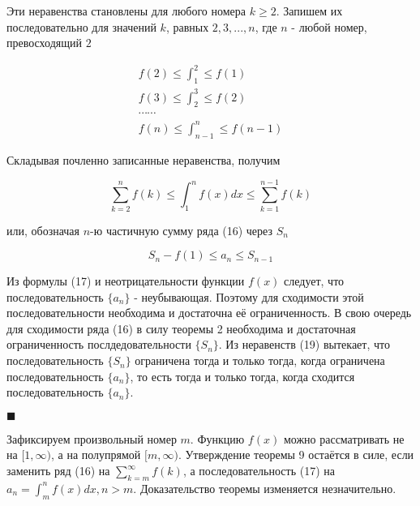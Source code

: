 Эти неравенства становлены для любого номера $k \geqslant 2$. Запишем их последовательно для значений $k$, равных $2, 3, ..., n$, где $n$ - любой номер, превосходящий $2$

\begin{equation*}
	\begin{gathered}
		f(2) \leqslant \displaystyle\int_{1}^2  \leqslant  f(1) \\
		f(3) \leqslant \displaystyle\int_{2}^3  \leqslant  f(2) \\
		\cdots \cdots \\
		f(n) \leqslant \displaystyle\int_{n -1}^n  \leqslant  f(n - 1)
	\end{gathered}
\end{equation*}

Складывая почленно записанные неравенства, получим

\begin{equation*}
	\displaystyle\sum_{k = 2}^n f(k) \leqslant \displaystyle\int_1^n f(x)dx \leqslant \displaystyle\sum_{k = 1}^{n - 1} f(k)
\end{equation*}

или, обозначая $n$-ю частичную сумму ряда (16) через $S_n$

\begin{equation}
	S_n - f(1) \leqslant a_n \leqslant S_{n - 1}
\end{equation}

Из формулы (17) и неотрицательности функции $f(x)$ следует, что последовательность $\{a_n\}$ - неубывающая. Поэтому для сходимости этой последовательности необходима и достаточна её ограниченность. В свою очередь для сходимости ряда (16) в силу теоремы 2 необходима и достаточная ограниченность послдедовательности $\{S_n\}$. Из неравенств (19) вытекает, что последовательность $\{S_n\}$ ограничена тогда и только тогда, когда ограничена последовательность $\{a_n\}$, то есть тогда и только тогда, когда сходится последовательность $\{a_n\}$.

\begin{flushright}
	$\blacksquare$
\end{flushright}

\begin{note}
	Зафиксируем произвольный номер $m$. Функцию $f(x)$ можно рассматривать не на $[1, \infty)$, а на полупрямой $[m, \infty)$. Утверждение теоремы 9 остаётся в силе, если заменить ряд (16) на {\small $\displaystyle\sum_{k = m}^\infty f(k)$}, а последовательность (17) на {\small $a_n = \displaystyle\int_m^n f(x)dx, n > m$}. Доказательство теоремы изменяется незначительно.
\end{note}

